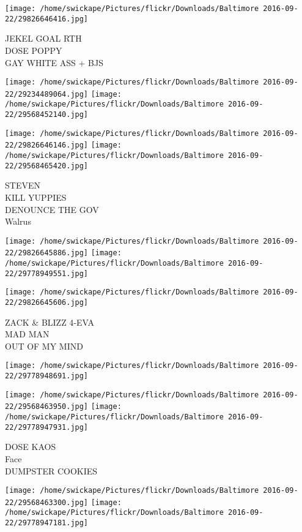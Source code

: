 \documentclass[10pt,letterpaper]{article}
\begin{document}
\vspace{0.25in}
\texttt{[image: /home/swickape/Pictures/flickr/Downloads/Baltimore 2016-09-22/29826646416.jpg]}

JEKEL GOAL RTH\\
DOSE POPPY\\
GAY WHITE ASS + BJS
\pagebreak

\texttt{[image: /home/swickape/Pictures/flickr/Downloads/Baltimore 2016-09-22/29234489064.jpg]}
\texttt{[image: /home/swickape/Pictures/flickr/Downloads/Baltimore 2016-09-22/29568452140.jpg]}

\texttt{[image: /home/swickape/Pictures/flickr/Downloads/Baltimore 2016-09-22/29826646146.jpg]}
\texttt{[image: /home/swickape/Pictures/flickr/Downloads/Baltimore 2016-09-22/29568465420.jpg]}

STEVEN\\
KILL YUPPIES\\
DENOUNCE THE GOV\\
Walrus
\pagebreak

\texttt{[image: /home/swickape/Pictures/flickr/Downloads/Baltimore 2016-09-22/29826645886.jpg]}
\texttt{[image: /home/swickape/Pictures/flickr/Downloads/Baltimore 2016-09-22/29778949551.jpg]}

\texttt{[image: /home/swickape/Pictures/flickr/Downloads/Baltimore 2016-09-22/29826645606.jpg]}

ZACK \& BLIZZ 4{-}EVA\\
MAD MAN\\
OUT OF MY MIND
\pagebreak

\texttt{[image: /home/swickape/Pictures/flickr/Downloads/Baltimore 2016-09-22/29778948691.jpg]}

\vspace{0.25in}
\texttt{[image: /home/swickape/Pictures/flickr/Downloads/Baltimore 2016-09-22/29568463950.jpg]}
\texttt{[image: /home/swickape/Pictures/flickr/Downloads/Baltimore 2016-09-22/29778947931.jpg]}

DOSE KAOS\\
Face\\
DUMPSTER COOKIES
\pagebreak

\texttt{[image: /home/swickape/Pictures/flickr/Downloads/Baltimore 2016-09-22/29568463300.jpg]}
\texttt{[image: /home/swickape/Pictures/flickr/Downloads/Baltimore 2016-09-22/29778947181.jpg]}
\end{document}
